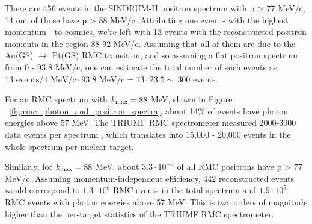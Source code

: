 \documentclass[12pt]{article}
\newcommand {\ra}        {\rightarrow}
\newcommand {\kmax}      {k_{\rm max}}
\begin{document}
There are 456 events in the SINDRUM-II positron spectrum with p > 77 MeV/c,
14 out of those have p > 88 MeV/c. Attributing one event - with the highest
momentum - to cosmics, we're left with 13 events with the reconstructed 
positron momenta in the region 88-92 MeV/c. Assuming that all of them are due
to the Au(GS) $\ra$ Pt(GS) RMC transition, and so assuming a flat positron spectrum
from 0 - 93.8 MeV/c, one can estimate the total number
of such events as $13\text{ events}/4\text{ MeV/c}\cdot 93.8\text{ MeV/c} = 13\cdot 23.5 \sim\ 300$ events.

For an RMC spectrum with $\kmax = 88$ MeV, shown in Figure ~\ref{fig:rmc_photon_and_positron_spectra}, 
about 14\% of events have photon energies above 57 MeV.
The TRIUMF RMC spectrometer measured 2000-3000 data events per spectrum \cite{}, which translates
into 15,000 - 20,000 events in the whole spectrum per nuclear target. 

Similarly, for $\kmax= 88$ MeV, about $3.3\cdot 10^{-4}$ of all RMC positrons have
p > 77 MeV/c. Assuming momentum-independent efficiency, 442 reconstructed events
would correspond to $1.3\cdot 10^6$ RMC events in the total spectrum and $1.9\cdot 10^5$ RMC events with
photon energies above 57 MeV. This is two orders of magnitude higher than the
per-target statistics of the TRIUMF RMC spectrometer.
\end{document}
